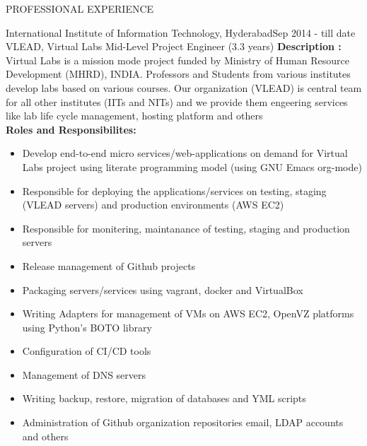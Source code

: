 \documentclass{resume} %
\begin{document}
\break
\begin{rSection}{PROFESSIONAL EXPERIENCE}

   \begin{rSubsection}
    {International Institute of Information Technology,
      Hyderabad}{Sep 2014 - till date} {VLEAD, Virtual Labs}
    {Mid-Level Project Engineer (3.3 years)} \hfill \break
    \textbf{Description :} Virtual Labs is a mission mode
    project funded by Ministry of Human Resource Development
    (MHRD), INDIA. Professors and Students from various
    institutes develop labs based on various courses. Our
    organization (VLEAD) is central team for all other
    institutes (IITs and NITs) and we provide them engeering
    services like lab life cycle management, hosting
    platform and others \\

    \textbf{Roles and Responsibilites:}
    \begin{itemize}
      
    \item Develop end-to-end micro services/web-applications
      on demand for Virtual Labs project using literate
      programming model (using GNU Emacs org-mode)
      
    \item Responsible for deploying the
      applications/services on testing, staging (VLEAD
      servers) and production environments (AWS EC2)

    \item Responsible for monitering, maintanance of
      testing, staging and production servers

    \item Release management of Github projects
      
    \item Packaging servers/services using vagrant,
      docker and VirtualBox

    \item Writing Adapters for management of VMs on AWS EC2,
      OpenVZ platforms using Python's BOTO library

    \item Configuration of CI/CD tools
      
    \item Management of DNS servers

    \item Writing backup, restore, migration of databases
      and YML scripts

    \item Administration of Github organization repositories
      email, LDAP accounts and others


\end{itemize}
\end{rSubsection}
\end{rSection}
\end{document}
